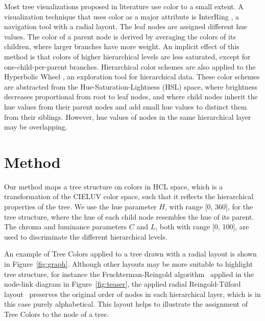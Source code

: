 \documentclass[journal]{vgtc}                %
\newcommand{\changedE}[1]{\textcolor{cornellred}{#1}}
\begin{document}
\changedE{
Most tree visualizations proposed in literature \cite{schulz2011} use color to a small extent. A visualization technique that uses color as a major attribute is InterRing \cite{yang2002}, a navigation tool with a radial layout. The leaf nodes are assigned different hue values. The color of a parent node is derived by averaging the colors of its children, where larger branches have more weight. An implicit effect of this method is that colors of higher hierarchical levels are less saturated, except for one-child-per-parent branches. 
Hierarchical color schemes are also applied to the Hyperbolic Wheel \cite{lam2012}, an exploration tool for hierarchical data.  These color schemes are abstracted from the Hue-Saturation-Lightness (HSL) space, where brightness decreases proportional from root to leaf nodes, and where child nodes inherit the hue values from their parent nodes and add small hue values to distinct them from their siblings. However, hue values of nodes in the same hierarchical layer may be overlapping.
}

\section{Method}\label{secmethod}
Our method maps a tree structure on colors in HCL space, which is a transformation of the CIELUV color space, such that it reflects the hierarchical properties of the tree. We use the hue parameter $H$, with range [0, 360], for the tree structure, where the hue of each child node resembles the hue of its parent. The chroma and luminance parameters $C$ and $L$, both with range [0, 100], are used to discriminate the different hierarchical levels.

An example of Tree Colors applied to a tree drawn with a radial layout is shown in Figure~\ref{fig:graph}. 
Although other layouts may be more suitable to highlight tree structure, for instance the Fruchterman-Reingold algorithm~\cite{Fruchterman91} applied in the node-link diagram in Figure~\ref{fig:teaser}, the applied radial Reingold-Tilford layout~\cite{reingold81} preserves the original order of nodes in each hierarchical layer, which is in this case purely alphabetical. This layout helps to illustrate the assignment of Tree Colors to the node of a tree. 
\end{document}
